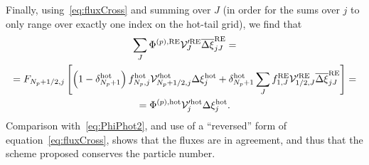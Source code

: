 \documentclass{notes}
\newcommand{\Vp}{\mathcal{V}'}
\begin{document}
    Finally, using~\eqref{eq:fluxCross} and summing over $J$ (in order for the
    sums over $j$ to only range over exactly one index on the hot-tail grid), we
    find that
    \begin{equation}
        \begin{gathered}
            \sum_J \Phi^{(p),{\rm RE}} \Vp^{\rm RE}_J \overline{\Delta\xi}_{jJ}^{\rm RE} =\\
             = F_{N_p+1/2,j}\left[
                 \left( 1-\delta^{\rm hot}_{N_p+1} \right)
                 f^{\rm hot}_{N_p,j}
                 \Vp^{\rm hot}_{N_p+1/2,j}\Delta\xi_j^{\rm hot}
                 +
                 \delta^{\rm hot}_{N_p+1}\sum_J f_{1,J}^{\rm RE}\Vp^{\rm RE}_{1/2,J}
                 \overline{\Delta\xi}^{\rm RE}_{jJ}
             \right] =\\
             = \Phi^{(p),{\rm hot}} \Vp^{\rm hot}_j\Delta\xi^{\rm hot}_j.
        \end{gathered}
    \end{equation}
    Comparison with~\eqref{eq:PhiPhot2}, and use of a ``reversed'' form of
    equation~\eqref{eq:fluxCross}, shows that the fluxes are in agreement, and
    thus that the scheme proposed conserves the particle number.
\end{document}

